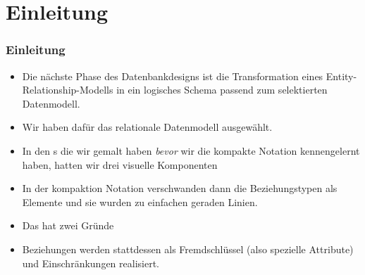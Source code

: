 \documentclass[aspectratio=169,mathserif,notheorems]{beamer}%
\subtitle{34.~Logisches Schema:~Relationales Datenmodell}%
\begin{document}
%
%
\startPresentation%
%
\section{Einleitung}%
%
\begin{frame}%
\frametitle{Einleitung}%
\begin{itemize}%
\item Die nächste Phase des Datenbankdesigns ist die Transformation eines Entity-Relationship-Modells in ein logisches Schema passend zum selektierten Datenmodell\cite{SS2005EIDDDFDB:SDLDUTRDM}.%
%
\item<2-> Wir haben dafür das relationale Datenmodell ausgewählt.%
%
\item<3-> In den s die wir gemalt haben \emph{bevor} wir die kompakte Notation kennengelernt haben, hatten wir drei visuelle Komponenten\only<-3>{.}%
%
\item<7-> In der kompaktion Notation verschwanden dann die Beziehungstypen als Elemente und sie wurden zu einfachen geraden Linien.%
%
\item<8-> Das hat zwei Gründe\only<-8>{.}%
%
\item<11-> Beziehungen werden stattdessen als Fremdschlüssel (also spezielle Attribute) und Einschränkungen realisiert.%
%
\end{itemize}%
\end{frame}%
%
\end{document}
